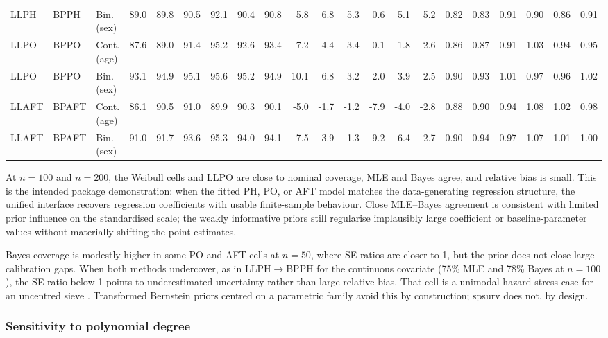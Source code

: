 \documentclass[5p,lefttitle]{elsarticle}
\providecommand{\pkg}[1]{\textsf{#1}}
\begin{document}
{\begin{table}[!h]
\begin{tabular}{@{}lll*{18}{r}@{}}
LLPH  & BPPH & Bin. (sex) & 89.0 & 89.8 & 90.5 & 92.1 & 90.4 & 90.8 &  5.8 &  6.8 &  5.3 &  0.6 &  5.1 &  5.2 & 0.82 & 0.83 & 0.91 & 0.90 & 0.86 & 0.91 \\
LLPO  & BPPO & Cont. (age) & 87.6 & 89.0 & 91.4 & 95.2 & 92.6 & 93.4 &  7.2 &  4.4 &  3.4 &  0.1 &  1.8 &  2.6 & 0.86 & 0.87 & 0.91 & 1.03 & 0.94 & 0.95 \\
LLPO  & BPPO & Bin. (sex) & 93.1 & 94.9 & 95.1 & 95.6 & 95.2 & 94.9 &  10.1 &  6.8 &  3.2 &  2.0 &  3.9 &  2.5 & 0.90 & 0.93 & 1.01 & 0.97 & 0.96 & 1.02 \\
LLAFT  & BPAFT & Cont. (age) & 86.1 & 90.5 & 91.0 & 89.9 & 90.3 & 90.1 & -5.0 & -1.7 & -1.2 & -7.9 & -4.0 & -2.8 & 0.88 & 0.90 & 0.94 & 1.08 & 1.02 & 0.98 \\
LLAFT  & BPAFT & Bin. (sex) & 91.0 & 91.7 & 93.6 & 95.3 & 94.0 & 94.1 & -7.5 & -3.9 & -1.3 & -9.2 & -6.4 & -2.7 & 0.90 & 0.94 & 0.97 & 1.07 & 1.01 & 1.00 \\
\bottomrule
\end{tabular}
\end{table}

At \(n=100\) and \(n=200\), the Weibull cells and LLPO are close to nominal coverage,
MLE and Bayes agree, and relative bias is small. This is the intended
package demonstration: when the fitted PH, PO, or AFT model matches
the data-generating regression structure, the unified
interface recovers regression coefficients with usable finite-sample
behaviour. Close MLE--Bayes agreement is consistent with limited prior
influence on the standardised scale; the weakly informative priors still
regularise implausibly large coefficient or baseline-parameter values
without materially shifting the point estimates.

Bayes coverage is modestly higher in some PO and AFT cells at \(n=50\),
where SE ratios are closer to 1, but the prior does not close large
calibration gaps. When both methods undercover, as in
LLPH\(\to\)BPPH for the continuous covariate (75\% MLE and 78\% Bayes at
\(n=100\)), the SE ratio below 1 points to underestimated uncertainty
rather than large relative bias. That cell is a unimodal-hazard stress
case for an uncentred sieve \citep{Osman:2012,de2025degree}. Transformed
Bernstein priors centred on a parametric family
\citep{Chen:2014,Zhou:2018} avoid this by construction; \pkg{spsurv} does
not, by design.



\subsubsection{Sensitivity to polynomial degree}\label{sensitivity-to-polynomial-degree}\label{sec:degree}

}
\end{document}
